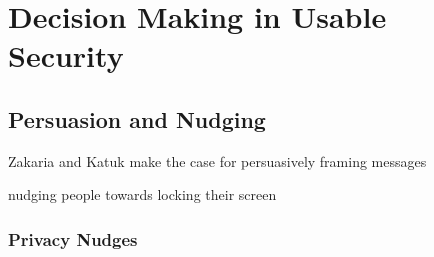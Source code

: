 
\chapter[Decision Making in Usable Security]{Decision Making in Usable Security}\label{chap:rw:persuasion}




	
	


	
	
\section{Persuasion and Nudging}


\cite{Zakaria2013DesigningEffectiveSecurityMessages} Zakaria and Katuk make the case for persuasively framing messages


nudging people towards locking their screen \cite{Bruggen2013ModifiyngUnlockingBehavior}

	\subsection{Privacy Nudges}
	


